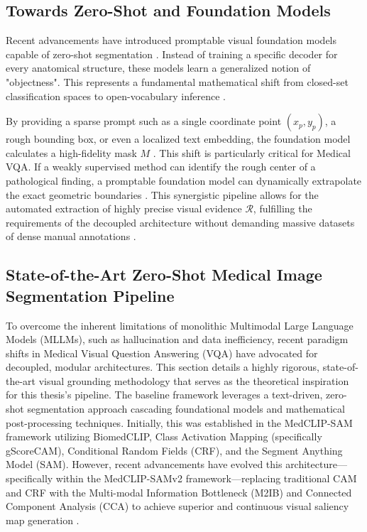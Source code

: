 \subsection{Towards Zero-Shot and Foundation Models}

Recent advancements have introduced promptable visual foundation models capable of zero-shot segmentation \cite{kirillov2023sam}. Instead of training a specific decoder for every anatomical structure, these models learn a generalized notion of "objectness". This represents a fundamental mathematical shift from closed-set classification spaces to open-vocabulary inference \cite{zou2024seem}.

By providing a sparse prompt such as a single coordinate point $(x_{p},y_{p})$, a rough bounding box, or even a localized text embedding, the foundation model calculates a high-fidelity mask $M$ \cite{kirillov2023sam}. This shift is particularly critical for Medical VQA. If a weakly supervised method can identify the rough center of a pathological finding, a promptable foundation model can dynamically extrapolate the exact geometric boundaries \cite{ma2023medsam}. This synergistic pipeline allows for the automated extraction of highly precise visual evidence $\mathcal{R}$, fulfilling the requirements of the decoupled architecture without demanding massive datasets of dense manual annotations \cite{wu2023medical-sam-survey}.



\subsection{State-of-the-Art Zero-Shot Medical Image Segmentation Pipeline}
\label{sec:sota_pipeline}
To overcome the inherent limitations of monolithic Multimodal Large Language Models (MLLMs), such as hallucination and data inefficiency, recent paradigm shifts in Medical Visual Question Answering (VQA) have advocated for decoupled, modular architectures. This section details a highly rigorous, state-of-the-art visual grounding methodology that serves as the theoretical inspiration for this thesis's pipeline.
The baseline framework leverages a text-driven, zero-shot segmentation approach cascading foundational models and mathematical post-processing techniques\cite{medclipsam}. Initially, this was established in the MedCLIP-SAM framework utilizing BiomedCLIP, Class Activation Mapping (specifically gScoreCAM), Conditional Random Fields (CRF), and the Segment Anything Model (SAM). However, recent advancements have evolved this architecture—specifically within the MedCLIP-SAMv2 framework—replacing traditional CAM and CRF with the Multi-modal Information Bottleneck (M2IB) and Connected Component Analysis (CCA) to achieve superior and continuous visual saliency map generation \cite{medclipsamv2}.

